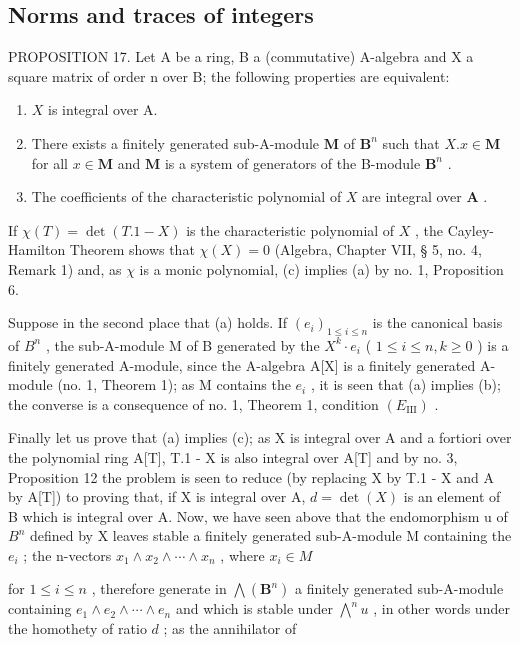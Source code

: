 \subsection{Norms and traces of integers}

PROPOSITION 17. Let A be a ring, B a (commutative) A-algebra and X a square matrix of order n over B; the following properties are equivalent:

\begin{enumerate}
\def\labelenumi{(\alph{enumi})}
\item
  \(X\) is integral over A.
\item
  There exists a finitely generated sub-A-module \(\mathbf{M}\) of \(\mathbf{B}^n\) such that \(X.x\in \mathbf{M}\) for all \(x\in \mathbf{M}\) and \(\mathbf{M}\) is a system of generators of the B-module \(\mathbf{B}^n\) .
\item
  The coefficients of the characteristic polynomial of \(X\) are integral over \(\mathbf{A}\) .
\end{enumerate}

  If \(\chi(T) = \det(T.1 - X)\) is the characteristic polynomial of \(X\) , the Cayley-Hamilton Theorem shows that \(\chi(X) = 0\) (Algebra, Chapter VII, § 5, no. 4, Remark 1) and, as \(\chi\) is a monic polynomial, (c) implies (a) by no. 1, Proposition 6.

  Suppose in the second place that (a) holds. If \((e_i)_{1 \leqslant i \leqslant n}\) is the canonical basis of \(B^n\) , the sub-A-module M of B generated by the \(X^k \cdot e_i\) ( \(1 \leqslant i \leqslant n, k \geqslant 0\) ) is a finitely generated A-module, since the A-algebra A[X] is a finitely generated A-module (no. 1, Theorem 1); as M contains the \(e_i\) , it is seen that (a) implies (b); the converse is a consequence of no. 1, Theorem 1, condition \((E_{\mathrm{III}})\) .

  Finally let us prove that (a) implies (c); as X is integral over A and a fortiori over the polynomial ring A[T], T.1 - X is also integral over A[T] and by no. 3, Proposition 12 the problem is seen to reduce (by replacing X by T.1 - X and A by A[T]) to proving that, if X is integral over A, \(d = \det(X)\) is an element of B which is integral over A. Now, we have seen above that the endomorphism u of \(B^{n}\) defined by X leaves stable a finitely generated sub-A-module M containing the \(e_{i}\) ; the n-vectors \(x_{1} \wedge x_{2} \wedge \cdots \wedge x_{n}\) , where \(x_{i} \in M\)

for \(1 \leqslant i \leqslant n\) , therefore generate in \(\bigwedge (\mathbf{B}^n)\) a finitely generated sub-A-module containing \(e_1 \wedge e_2 \wedge \cdots \wedge e_n\) and which is stable under \(\bigwedge^n u\) , in other words under the homothety of ratio \(d\) ; as the annihilator of

